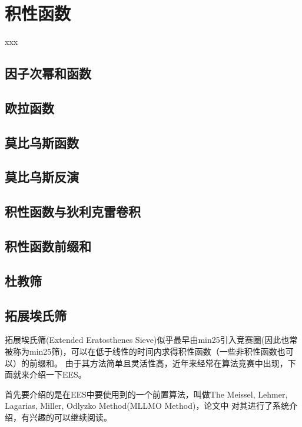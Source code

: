 \chapter{积性函数}

\begin{introduction}
	\item xxx
\end{introduction}


\section{因子次幂和函数}


\section{欧拉函数}


\section{莫比乌斯函数}


\section{莫比乌斯反演}


\section{积性函数与狄利克雷卷积}


\section{积性函数前缀和}


\section{杜教筛}


\section{拓展埃氏筛}
拓展埃氏筛(Extended Eratosthenes Sieve)似乎最早由min25引入竞赛圈(因此也常被称为min25筛)，可以在{\heiti 低于线性的时间}内求得积性函数（一些非积性函数也可以）的前缀和。
由于其方法简单且灵活性高，近年来经常在算法竞赛中出现，下面就来介绍一下EES。

首先要介绍的是在EES中要使用到的一个前置算法，叫做The Meissel, Lehmer, Lagarias, Miller, Odlyzko Method{\heiti (MLLMO Method)}，论文\cite{Deleglise1996Computing}中
对其进行了系统介绍，有兴趣的可以继续阅读。

